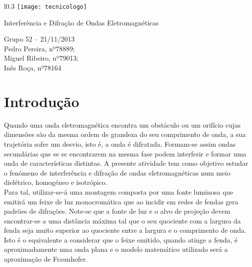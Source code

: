 \documentclass[10pt,a4paper]{article}
\author{Pedro Pereira, nº78889; Miguel Ribeiro, nº79013; Inês Roça, nº78164}
\date{}
\begin{document}
\begin{wrapfigure}{l}{0.3\textwidth}
\vspace*{-3.3cm}
\hspace*{4cm}
    \texttt{[image: tecnicologo]}
\end{wrapfigure}

{\begin{flushleft}
{ \Huge {Interferência e Difração de Ondas Eletromagnéticas}} \\[0.4cm]
\end{flushleft}

\begin{flushright}
\begin{framed}
Grupo 52 – 21/11/2013\\Pedro Pereira, nº78889;\\Miguel Ribeiro, nº79013;\\Inês Roça, nº78164
\end{framed}
\end{flushright}	
\section*{Introdução}
Quando uma onda eletromagnética encontra um obstáculo ou um orifício cujas dimensões são da mesma ordem de grandeza do seu comprimento de onda, a sua trajetória sofre um desvio, isto é, a onda é difratada. Formam-se assim ondas secundárias que se se encontrarem na mesma fase podem interferir e formar uma onda de características distintas. A presente atividade tem como objetivo estudar o fenómeno de interferência e difração de ondas eletromagnéticas num meio dielétrico, homogéneo e isotrópico. \\Para tal, utilizar-se-á uma montagem composta por uma fonte luminosa que emitirá um feixe de luz monocromática que ao incidir em redes de fendas gera padrões de difrações. Note-se que a fonte de luz e o alvo de projeção devem encontrar-se a uma distância máxima tal que o seu quociente com a largura da fenda seja muito superior ao quociente entre a largura e o comprimento de onda. Isto é o equivalente a considerar que o feixe emitido, quando atinge a fenda, é aproximadamente uma onda plana e o modelo matemático utilizado será a aproximação de Fraunhofer.
}
\end{document}
